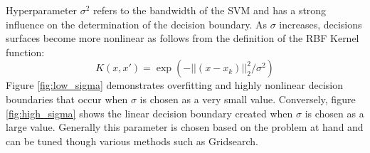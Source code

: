 \documentclass{article}
\begin{document}
        Hyperparameter $\sigma^2$ refers to the bandwidth of the SVM and has a strong influence on the determination of the decision boundary. As $\sigma$ increases, decisions surfaces become more nonlinear as follows from the definition of the RBF Kernel function: 
        \begin{equation}
            K(x,x') = \exp (-||(x-x_k)||_2^2 / \sigma^2)
        \end{equation}
        Figure \ref{fig:low_sigma} demonstrates overfitting and highly nonlinear decision boundaries that occur when $\sigma$ is chosen as a very small value. Conversely, figure \ref{fig:high_sigma} shows the linear decision boundary created when $\sigma$ is chosen as a large value. Generally this parameter is chosen based on the problem at hand and can be tuned though various methods such as Gridsearch. 
\end{document}
